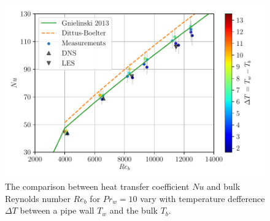 \documentclass[12pt,oneside]{jbook}
\begin{document}
\begin{figure}[ht]
	\vspace{0zh}
	\begin{center}
		\includegraphics[width=1\linewidth]{fig/pr10heatflux_renudt.pdf}
		\vspace{-3zh}
		\caption{The comparison between heat transfer coefficient $Nu$ and bulk Reynolds number $Re_{b}$ for $Pr_{w} = 10$ vary with temperature defference $\Delta T$ between a pipe wall $T_{w}$ and the bulk $T_{b}$.}
		\label{}
	\end{center}
	\vspace{0zh}
\end{figure}
\end{document}
